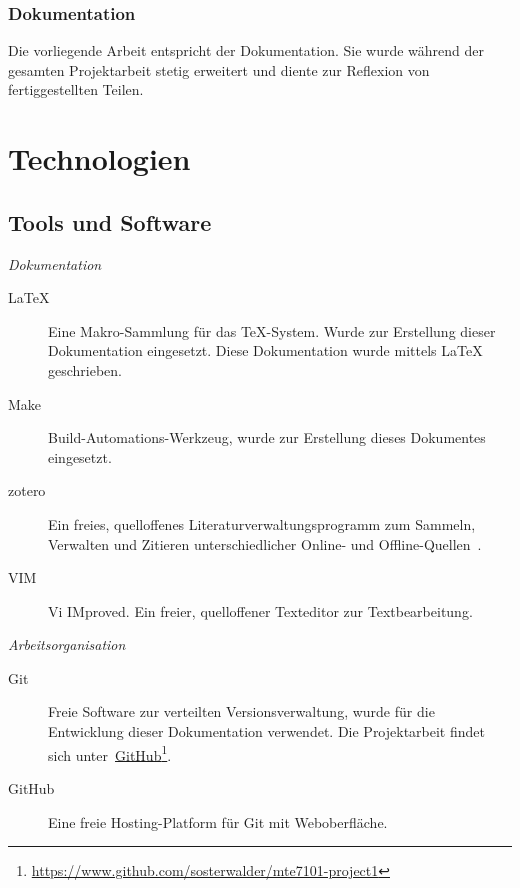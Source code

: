 \subsubsection{Dokumentation}
\label{ssubsec:documentation}

Die vorliegende Arbeit entspricht der Dokumentation. Sie wurde während
der gesamten Projektarbeit stetig erweitert und diente zur Reflexion von
fertiggestellten Teilen.

\section{Technologien}
\label{sec:technologies}

\subsection{Tools und Software}
\label{subsec:tools_software}

\noindent\emph{Dokumentation}
\begin{description}
    \item[\LaTeX] Eine Makro-Sammlung für das \TeX-System. Wurde zur
        Erstellung dieser Dokumentation eingesetzt. Diese Dokumentation
        wurde mittels \LaTeX{} geschrieben.
    \item[Make] Build-Automations-Werkzeug, wurde zur Erstellung dieses Dokumentes eingesetzt.
    \item[zotero] Ein freies, quelloffenes Literaturverwaltungsprogramm
        zum Sammeln, Verwalten und Zitieren unterschiedlicher Online-
        und Offline-Quellen~\cite{wikipedia_foundation_zotero_2015}.
    \item[VIM] Vi IMproved. Ein freier, quelloffener Texteditor zur Textbearbeitung.
\end{description}

\noindent\emph{Arbeitsorganisation}
\begin{description}
    \item[Git] Freie Software zur verteilten Versionsverwaltung, wurde
        für die Entwicklung dieser Dokumentation verwendet. Die
        Projektarbeit findet sich
        unter~\href{https://www.github.com/sosterwalder/mte7101-project1}{GitHub}\footnote{\href{https://www.github.com/sosterwalder/mte7101-project1}{https://www.github.com/sosterwalder/mte7101-project1}}.
    \item[GitHub] Eine freie Hosting-Platform für Git mit Weboberfläche.
\end{description}

